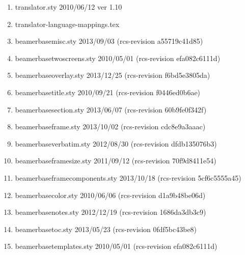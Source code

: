 \begin{enumerate}
\item translator.sty 2010/06/12 ver 1.10
\item translator-language-mappings.tex
\item beamerbasemisc.sty 2013/09/03 (rcs-revision a55719c41d85)
\item beamerbasetwoscreens.sty 2010/05/01 (rcs-revision efa082c6111d)
\item beamerbaseoverlay.sty 2013/12/25 (rcs-revision f6bd5e3805da)
\item beamerbasetitle.sty 2010/09/21 (rcs-revision f0446ed0b6ae)
\item beamerbasesection.sty 2013/06/07 (rcs-revision 60b9fe0f342f)
\item beamerbaseframe.sty 2013/10/02 (rcs-revision cdc8e9a3aaac)
\item beamerbaseverbatim.sty 2012/08/30 (rcs-revision dfdb135076b3)
\item beamerbaseframesize.sty 2011/09/12 (rcs-revision 70f9d8411e54)
\item beamerbaseframecomponents.sty 2013/10/18 (rcs-revision 5cf6c5555a45)
\item beamerbasecolor.sty 2010/06/06 (rcs-revision d1a9b48be06d)
\item beamerbasenotes.sty 2012/12/19 (rcs-revision 1686da3db3c9)
\item beamerbasetoc.sty 2013/05/23 (rcs-revision 0fdf5bc43be8)
\item beamerbasetemplates.sty 2010/05/01 (rcs-revision efa082c6111d)

\end{enumerate}
